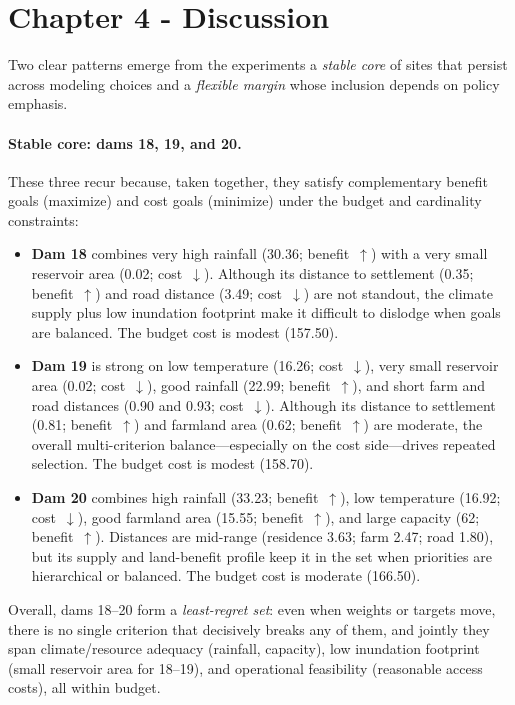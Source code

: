 \section{Chapter 4 - Discussion}\label{sec:discussion}
Two clear patterns emerge from the experiments a \textit{stable core} of sites that persist across modeling choices and a \textit{flexible margin} whose inclusion depends on policy emphasis.

\paragraph{Stable core: dams 18, 19, and 20.}
These three recur because, taken together, they satisfy complementary benefit goals (maximize) and cost goals (minimize) under the budget and cardinality constraints:
\begin{itemize}
\item \textbf{Dam 18} combines very high rainfall (30.36; benefit~$\uparrow$) with a very small reservoir area (0.02; cost~$\downarrow$). Although its distance to settlement (0.35; benefit~$\uparrow$) and road distance (3.49; cost~$\downarrow$) are not standout, the climate supply plus low inundation footprint make it difficult to dislodge when goals are balanced. The budget cost is modest (157.50).
\item \textbf{Dam 19} is strong on low temperature (16.26; cost~$\downarrow$), very small reservoir area (0.02; cost~$\downarrow$), good rainfall (22.99; benefit~$\uparrow$), and short farm and road distances (0.90 and 0.93; cost~$\downarrow$). Although its distance to settlement (0.81; benefit~$\uparrow$) and farmland area (0.62; benefit~$\uparrow$) are moderate, the overall multi-criterion balance---especially on the cost side---drives repeated selection. The budget cost is modest (158.70).
\item \textbf{Dam 20} combines high rainfall (33.23; benefit~$\uparrow$), low temperature (16.92; cost~$\downarrow$), good farmland area (15.55; benefit~$\uparrow$), and large capacity (62; benefit~$\uparrow$). Distances are mid-range (residence 3.63; farm 2.47; road 1.80), but its supply and land-benefit profile keep it in the set when priorities are hierarchical or balanced. The budget cost is moderate (166.50).
\end{itemize}
Overall, dams 18--20 form a \textit{least-regret set}: even when weights or targets move, there is no single criterion that decisively breaks any of them, and jointly they span climate/resource adequacy (rainfall, capacity), low inundation footprint (small reservoir area for 18--19), and operational feasibility (reasonable access costs), all within budget.

